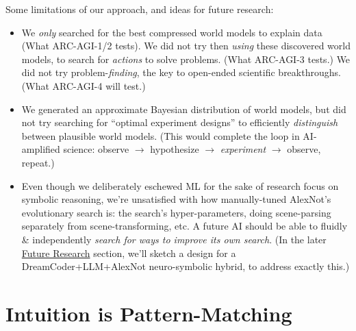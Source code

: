 \documentclass[11pt]{article}
\begin{document}
Some limitations of our approach, and ideas for future research:

\begin{itemize}
    \item We \textit{only} searched for the best compressed world models to explain data (What ARC-AGI-1/2 tests). We did not try then \textit{using} these discovered world models, to search for \textit{actions} to solve problems. (What ARC-AGI-3 tests.) We did not try problem-\textit{finding}, the key to open-ended scientific breakthroughs. (What ARC-AGI-4 will test.)
    \item We generated an approximate Bayesian distribution of world models, but did not try searching for ``optimal experiment designs'' to efficiently \textit{distinguish} between plausible world models. (This would complete the loop in AI-amplified science: observe $\to$ hypothesize $\to$ \textit{experiment} $\to$ observe, repeat.)
    \item Even though we deliberately eschewed ML for the sake of research focus on symbolic reasoning, we're unsatisfied with how manually-tuned AlexNot's evolutionary search is: the search's hyper-parameters, doing scene-parsing separately from scene-transforming, etc. A future AI should be able to fluidly \& independently \textit{search for ways to improve its own search}. (In the later \hyperref[sec:limitations]{Future Research} section, we'll sketch a design for a DreamCoder+LLM+AlexNot neuro-symbolic hybrid, to address exactly this.)
\end{itemize}






\section{Intuition is Pattern-Matching}\label{sec:pattern_matching}
\end{document}
